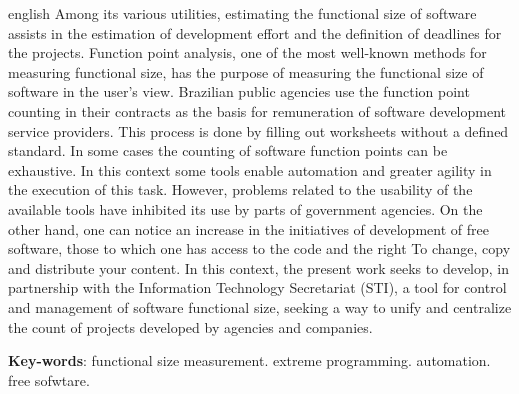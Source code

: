 \begin{resumo}[Abstract]
 \begin{otherlanguage*}{english}
 Among its various utilities, estimating the functional size of software assists in the estimation of development effort and the definition of deadlines for the projects. Function point analysis, one of the most well-known methods for measuring functional size, has the purpose of measuring the functional size of software in the user's view. Brazilian public agencies use the function point counting in their contracts as the basis for remuneration of software development service providers. This process is done by filling out worksheets without a defined standard. In some cases the counting of software function points can be exhaustive. In this context some tools enable automation and greater agility in the execution of this task. However, problems related to the usability of the available tools have inhibited its use by parts of government agencies. On the other hand, one can notice an increase in the initiatives of development of free software, those to which one has access to the code and the right To change, copy and distribute your content. In this context, the present work seeks to develop, in partnership with the Information Technology Secretariat (STI), a tool for control and management of software functional size, seeking a way to unify and centralize the count of projects developed by agencies and companies.

   \vspace{\onelineskip}

   \noindent
   \textbf{Key-words}: functional size measurement. extreme programming. automation. free sofwtare.
 \end{otherlanguage*}
\end{resumo}
